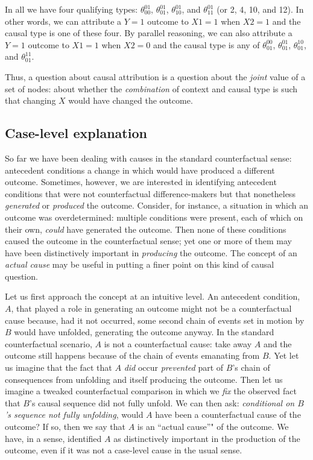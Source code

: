 \documentclass[12pt,]{book}
\begin{document}
In all we have four qualifying types: \(\theta_{00}^{01}\), \(\theta_{01}^{01}\), \(\theta_{10}^{01}\), and \(\theta_{11}^{01}\) (or 2, 4, 10, and 12). In other words, we can attribute a \(Y=1\) outcome to \(X1=1\) when \(X2=1\) and the causal type is one of these four. By parallel reasoning, we can also attribute a \(Y=1\) outcome to \(X1=1\) when \(X2=0\) and the causal type is any of \(\theta_{01}^{00}\), \(\theta_{01}^{01}\), \(\theta_{01}^{10}\), and \(\theta_{01}^{11}\).

Thus, a question about causal attribution is a question about the \emph{joint} value of a set of nodes: about whether the \emph{combination} of context and causal type is such that changing \(X\) would have changed the outcome.

\hypertarget{case-level-explanation}{%
\subsection{Case-level explanation}\label{case-level-explanation}}

So far we have been dealing with causes in the standard counterfactual sense: antecedent conditions a change in which would have produced a different outcome. Sometimes, however, we are interested in identifying antecedent conditions that were not counterfactual difference-makers but that nonetheless \emph{generated} or \emph{produced} the outcome. Consider, for instance, a situation in which an outcome was overdetermined: multiple conditions were present, each of which on their own, \emph{could} have generated the outcome. Then none of these conditions caused the outcome in the counterfactual sense; yet one or more of them may have been distinctively important in \emph{producing} the outcome. The concept of an \emph{actual cause} may be useful in putting a finer point on this kind of causal question.

Let us first approach the concept at an intuitive level. An antecedent condition, \(A\), that played a role in generating an outcome might not be a counterfactual cause because, had it not occurred, some second chain of events set in motion by \(B\) would have unfolded, generating the outcome anyway. In the standard counterfactual scenario, \(A\) is not a counterfactual cause: take away \(A\) and the outcome still happens because of the chain of events emanating from \(B\). Yet let us imagine that the fact that \(A\) \emph{did} occur \emph{prevented} part of \(B\)'s chain of consequences from unfolding and itself producing the outcome. Then let us imagine a tweaked counterfactual comparison in which we \emph{fix} the observed fact that \(B\)'s causal sequence did not fully unfold. We can then ask: \emph{conditional on \(B\)'s sequence not fully unfolding}, would \(A\) have been a counterfactual cause of the outcome? If so, then we say that \(A\) is an ``actual cause''" of the outcome. We have, in a sense, identified \(A\) as distinctively important in the production of the outcome, even if it was not a case-level cause in the usual sense.
\end{document}
